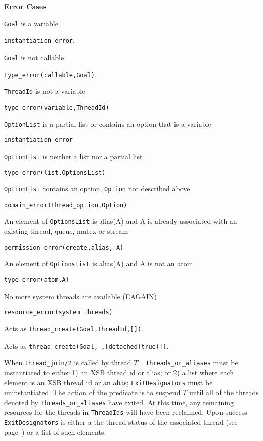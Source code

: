 \begin{description}
{\bf Error Cases}
\bi
\item 	{\tt Goal} is a variable
\bi
\item 	{\tt instantiation\_error}.
\ei
\item 	{\tt Goal} is not callable
\bi
\item 	{\tt type\_error(callable,Goal)}.
\ei
\item 	{\tt ThreadId} is not a variable
\bi
\item 	{\tt type\_error(variable,ThreadId)}
\ei
\item 	{\tt OptionList} is a partial list or contains an option that is a variable
\bi
\item 	{\tt instantiation\_error}
\ei
\item 	{\tt OptionList} is neither a list nor a partial list
\bi
\item 	{\tt type\_error(list,OptionsList)}
\ei
\item 	{\tt OptionList} contains an option, {\tt Option} not described above
\bi
\item 	{\tt domain\_error(thread\_option,Option)}
\ei
\item An element of {\tt OptionsList} is alias(A) and A is already
  associated with an existing thread, queue, mutex or stream 
\bi
\item {\tt permission\_error(create,alias, A)}
\ei
\item An element of {\tt OptionsList} is alias(A) and A is not an atom
\bi
\item {\tt type\_error(atom,A)}
\ei
\item   No more system threads are available (EAGAIN)
\bi
\item {\tt resource\_error(system threads)}
\ei
\ei

%
Acts as {\tt thread\_create(Goal,ThreadId,[])}.

%
Acts as {\tt thread\_create(Goal,\_,[detached(true)])}.

% 
When {\tt thread\_join/2} is called by thread $T$, {\tt
  Threads\_or\_aliases} must be instantiated to either 1) an XSB
thread id or alias; or 2) a list where each element is an XSB thread
id or an alias; {\tt ExitDesignators} must be uninstantiated.  The
action of the predicate is to suspend $T$ until all of the threads
denoted by {\tt Threads\_or\_aliases} have exited.  At this time, any
remaining resources for the threads in {\tt ThreadIds} will have been
reclaimed.  Upon success {\tt ExitDesignators} is either a the thread
status of the associated thread (see page~\pageref{page:thread-status}) 
or a list of such elements.  


\end{description}
